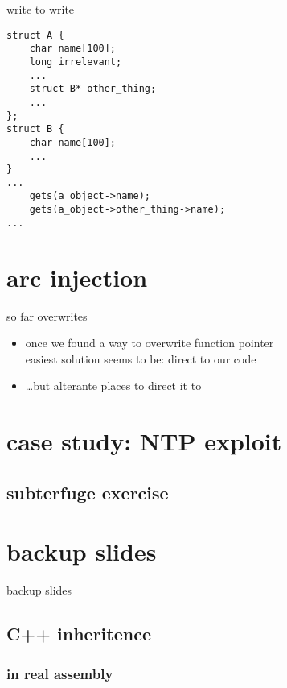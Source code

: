 \begin{frame}[fragile]{write to write}
\begin{Verbatim}[fontsize=\small]
struct A {
    char name[100];
    long irrelevant;
    ...
    struct B* other_thing;
    ...
};
struct B {
    char name[100];
    ...
}
...
    gets(a_object->name);
    gets(a_object->other_thing->name);
...
\end{Verbatim}
\end{frame}


\section{arc injection}
\begin{frame}{so far overwrites}
    \begin{itemize}
    \item once we found a way to overwrite function pointer\\
          easiest solution seems to be: direct to our code
    \item \ldots but alterante places to direct it to
    \end{itemize}
\end{frame}



\section{case study: NTP exploit}


\subsection{subterfuge exercise}


\section{backup slides}
\begin{frame}{backup slides}
\end{frame}
\subsection{C++ inheritence}


\subsubsection{in real assembly}




